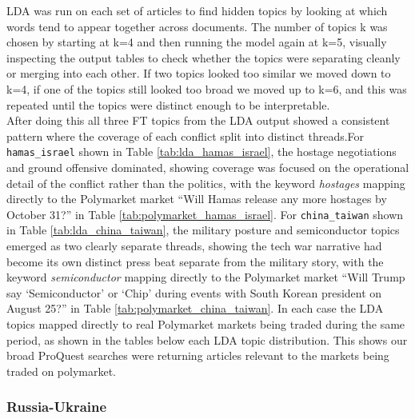 \documentclass[11pt,a4paper]{article}
\begin{document}
LDA was run on each set of articles to find hidden topics by looking at 
which words tend to appear together across documents. The number of topics 
k was chosen by starting at k=4 and then running the model again at k=5, 
visually inspecting the output tables to check whether the topics were 
separating cleanly or merging into each other. If two topics looked too 
similar we moved down to k=4, if one of the topics still looked too broad we 
moved up to k=6, and this was repeated until the topics were distinct 
enough to be interpretable.\\


After doing this all three FT topics from the LDA output showed a consistent pattern where the coverage of each conflict split into distinct threads.For \texttt{hamas\_israel} shown in Table \ref{tab:lda_hamas_israel}, the 
hostage negotiations and ground offensive dominated, showing coverage was 
focused on the operational detail of the conflict rather than the politics, 
with the keyword \textit{hostages} mapping directly to the Polymarket market 
``Will Hamas release any more hostages by October 31?'' in Table 
\ref{tab:polymarket_hamas_israel}. For \texttt{china\_taiwan} shown in Table 
\ref{tab:lda_china_taiwan}, the military posture and semiconductor topics 
emerged as two clearly separate threads, showing the tech war narrative had 
become its own distinct press beat separate from the military story, with the 
keyword \textit{semiconductor} mapping directly to the Polymarket market 
``Will Trump say `Semiconductor' or `Chip' during events with South Korean 
president on August 25?'' in Table \ref{tab:polymarket_china_taiwan}. In each 
case the LDA topics mapped directly to real Polymarket markets being traded 
during the same period, as shown in the tables below each LDA topic 
distribution. This shows our broad ProQuest searches were returning articles relevant to the markets being traded on polymarket.

\subsubsection*{Russia-Ukraine}
\end{document}
